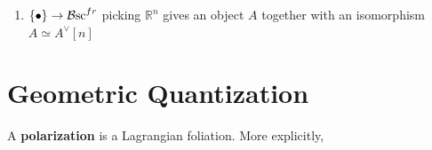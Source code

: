 \documentclass{article}
\begin{document}
\begin{enumerate}
    \item $\{\bullet\} \rightarrow \operatorname{\mathcal{B}sc}^{fr}$ picking $\mathbb{R}^n$ gives an object $A$ together with an isomorphism $A \simeq A^\vee[n]$
\end{enumerate}

\section{Geometric Quantization}

\begin{definition}
    A \textbf{polarization} is a Lagrangian foliation. More explicitly, 
\end{definition}
\end{document}
